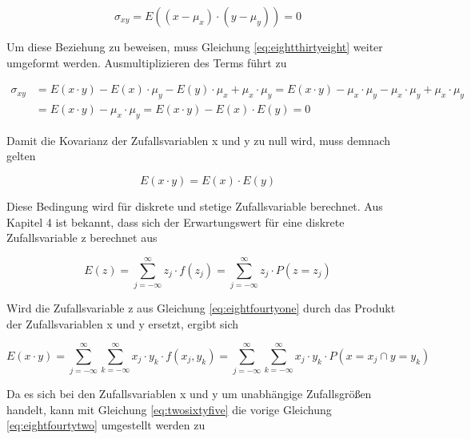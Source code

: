 \begin{equation}\label{eq:eightthirtyeight}
\sigma _{xy} =E\left((x-\mu _{x})\cdot (y-\mu _{y})\right)=0
\end{equation}

\noindent Um diese Beziehung zu beweisen, muss Gleichung \eqref{eq:eightthirtyeight} weiter umgeformt werden. Ausmultiplizieren des Terms f\"{u}hrt zu

\begin{equation}\label{eq:eightthirtynine}
\begin{split}
\sigma _{xy} & = E(x\cdot y)-E(x)\cdot \mu _{y} -E(y)\cdot \mu _{x} +\mu _{x} \cdot \mu _{y} =E(x\cdot y)-\mu _{x} \cdot \mu _{y} -\mu _{x} \cdot \mu _{y} +\mu _{x} \cdot \mu _{y}\\
& = E(x\cdot y)-\mu _{x} \cdot \mu _{y}= E(x\cdot y)-E(x)\cdot E(y) = 0
\end{split}
\end{equation}

\noindent Damit die Kovarianz der Zufallsvariablen x und y zu null wird, muss demnach gelten

\begin{equation}\label{eq:eightfourty}
E(x\cdot y)=E(x)\cdot E(y)
\end{equation}

\noindent Diese Bedingung wird f\"{u}r diskrete und stetige Zufallsvariable berechnet. Aus Kapitel 4 ist bekannt, dass sich der Erwartungswert f\"{u}r eine diskrete Zufallsvariable z berechnet aus

\begin{equation}\label{eq:eightfourtyone}
E(z)=\sum _{j=-\infty }^{\infty}z_{j}  \cdot f(z_{j})=\sum _{j=-\infty }^{\infty }z_{j}  \cdot P(z=z_{j})
\end{equation}

\noindent Wird die Zufallsvariable z aus Gleichung \eqref{eq:eightfourtyone} durch das Produkt der Zufallsvariablen x und y ersetzt, ergibt sich

\begin{equation}\label{eq:eightfourtytwo}
E(x\cdot y)=\sum _{j=-\infty }^{\infty }\sum _{k=-\infty}^{\infty}x_{j}  \cdot y_{k} \cdot f\left(x_{j} ,y_{k} \right) =\sum _{j=-\infty }^{\infty}\sum _{k=-\infty}^{\infty}x_{j}  \cdot y_{k} \cdot P(x=x_{j} \cap y=y_{k})
\end{equation}

\noindent Da es sich bei den Zufallsvariablen x und y um unabh\"{a}ngige Zufallsgr\"{o}{\ss}en handelt, kann mit Gleichung \eqref{eq:twosixtyfive} die vorige Gleichung \eqref{eq:eightfourtytwo} umgestellt werden zu

